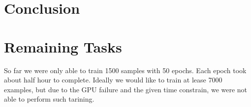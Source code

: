 \documentclass[12pt]{article}
\begin{document}
\section{Conclusion}


\section{Remaining Tasks}
So far we were only able to train 1500 samples with 50 epochs. Each epoch took about half hour to complete. Ideally we would like to train at lease 7000 examples, but due to the GPU failure and the given time constrain, we were not able to perform such tarining.


\end{document}
